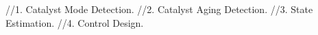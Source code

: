 //1. Catalyst Mode Detection.
//2. Catalyst Aging Detection.
//3. State Estimation.
//4. Control Design.